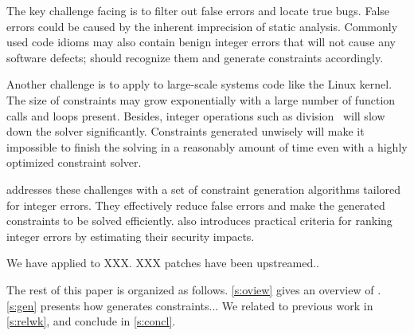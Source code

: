 The key challenge facing \sys is to filter out false errors and
locate true bugs.  False errors could be caused by the inherent
imprecision of static analysis.  Commonly used code idioms may also
contain benign integer errors that will not cause any software
defects; \sys should recognize them and generate constraints
accordingly.

Another challenge is to apply \sys to large-scale systems code like
the Linux kernel.  The size of constraints may grow exponentially
with a large number of function calls and loops present.  Besides,
integer operations such as division~\cite{brummayer:perf} will slow
down the solver significantly.  Constraints generated unwisely will
make it impossible to finish the solving in a reasonably amount
of time even with a highly optimized constraint solver.

\sys addresses these challenges with a set of constraint generation
algorithms tailored for integer errors.  They effectively reduce
false errors and make the generated constraints to be solved
efficiently.  \sys also introduces practical criteria for ranking
integer errors by estimating their security impacts.

We have applied \sys to XXX.  XXX patches have been upstreamed..

The rest of this paper is organized as follows. \autoref{s:oview}
gives an overview of \sys.  \autoref{s:gen} presents how \sys
generates constraints...  We related \sys to previous work in
\autoref{s:relwk}, and conclude in \autoref{s:concl}.
